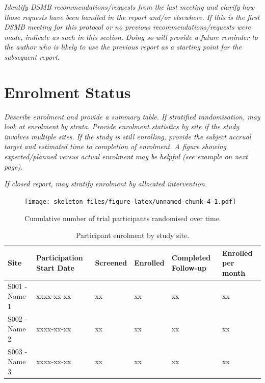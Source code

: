 \documentclass[
  11pt,
]{article}
\begin{document}
\emph{Identify DSMB recommendations/requests from the last meeting and clarify how those requests have been handled in the report and/or elsewhere.}
\emph{If this is the first DSMB meeting for this protocol or no previous recommendations/requests were made, indicate as such in this section.}
\emph{Doing so will provide a future reminder to the author who is likely to use the previous report as a starting point for the subsequent report.}

\clearpage

\hypertarget{enrolment-status}{%
\section{Enrolment Status}\label{enrolment-status}}

\emph{Describe enrolment and provide a summary table.}
\emph{If stratified randomisation, may look at enrolment by strata.}
\emph{Provide enrolment statistics by site if the study involves multiple sites.}
\emph{If the study is still enrolling, provide the subject accrual target and estimated time to completion of enrolment.}
\emph{A figure showing expected/planned versus actual enrolment may be helpful (see example on next page).}

\emph{If closed report, may stratify enrolment by allocated intervention.}

\begin{center}
  
\end{center}

\begin{center}
  
\end{center}

\begin{figure}
\centering
\texttt{[image: skeleton\_files/figure-latex/unnamed-chunk-4-1.pdf]}
\caption{\label{fig:unnamed-chunk-4}Cumulative number of trial participants randomised over time.}
\end{figure}

\begin{table}

\caption{\label{tab:unnamed-chunk-5}Participant enrolment by study site.}
\centering
\begin{tabular}[t]{l>{\raggedright\arraybackslash}p{2cm}>{\raggedleft\arraybackslash}p{2cm}>{\raggedleft\arraybackslash}p{2cm}>{\raggedleft\arraybackslash}p{2cm}>{\raggedleft\arraybackslash}p{2cm}}
\toprule
Site & Participation Start Date & Screened & Enrolled & Completed Follow-up & Enrolled per month\\
\midrule
S001 - Name 1 & xxxx-xx-xx & xx & xx & xx & xx\\
S002 - Name 2 & xxxx-xx-xx & xx & xx & xx & xx\\
S003 - Name 3 & xxxx-xx-xx & xx & xx & xx & xx\\
\bottomrule
\end{tabular}
\end{table}
\end{document}
